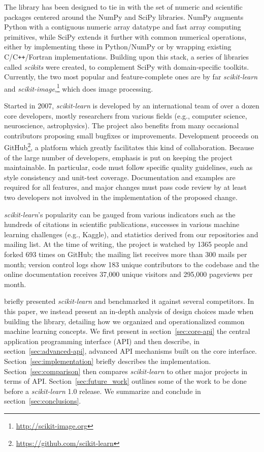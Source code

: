 \documentclass{llncs}
\newcommand{\sklearn}{\textit{scikit-learn}\xspace}
\begin{document}
The library has been designed to tie in with the set of numeric
and scientific packages centered around the NumPy and SciPy libraries. NumPy
\citep{vanderwalt2011} augments Python with a contiguous numeric array datatype
and fast array computing primitives,
while SciPy \citep{varoquaux2013scipy} extends it
further with common numerical operations, either by implementing
these in Python/NumPy or by wrapping existing C/C{}\verb!++!/Fortran
implementations. Building upon this stack, a series of libraries called
\textit{scikits} were created, to complement SciPy with
domain-specific toolkits. Currently, the two most popular and feature-complete
ones are by far \sklearn and
\textit{scikit-image},\footnote{\url{http://scikit-image.org}}
which does image processing.

Started in 2007, \sklearn is developed by an international team of over a dozen
core developers, mostly researchers from various fields (e.g.,
computer science, neuroscience, astrophysics). The project also benefits
from many occasional contributors proposing small bugfixes or
improvements. Development proceeds on GitHub\footnote{\url{https://github.com/scikit-learn}},
a platform which greatly facilitates this kind of
collaboration. Because of the large number of developers, emphasis is
put on keeping the project maintainable. In particular, code must follow
specific quality guidelines, such as style consistency and unit-test coverage.
Documentation and examples are required for all features,
and major changes must pass code review by at least two
developers not involved in the implementation of the proposed change.

\sklearn's popularity can be gauged from various indicators such as the hundreds
of citations in scientific publications, successes in various machine learning
challenges (e.g., Kaggle), and statistics derived from our
repositories and mailing list.  At the time of writing, the project is watched
by 1365 people and forked 693 times on GitHub; the mailing list receives more
than 300 mails per month; version control logs
show 183 unique contributors to the codebase and the online documentation
receives 37,000 unique visitors and 295,000 pageviews per month.

\citet{pedregosa2011} briefly presented \sklearn and
benchmarked it against several competitors.
In this paper, we instead present an
in-depth analysis of design choices made when building the library,
detailing how we organized and operationalized
common machine learning concepts.
We first present in section~\ref{sec:core-api} the central application
programming interface (API) and then describe, in section~\ref{sec:advanced-api},
advanced API mechanisms built on the core interface.
Section~\ref{sec:implementation} briefly describes the implementation.
Section~\ref{sec:comparison} then
compares \sklearn to other major projects in terms of API\@.
Section~\ref{sec:future_work} outlines some of the work to be done before
a \sklearn 1.0 release.
We summarize and conclude in section~\ref{sec:conclusions}.
\end{document}
